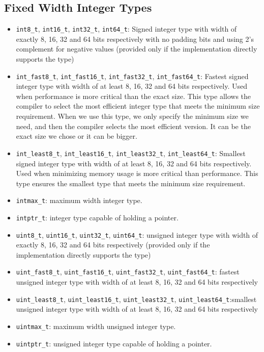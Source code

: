 \documentclass[12pt]{article}
\begin{document}
\subsection{Fixed Width Integer Types}
\begin{itemize}
    \item\texttt{int8\_t}, \texttt{int16\_t}, \texttt{int32\_t}, \texttt{int64\_t}: Signed integer type with width of
exactly 8, 16, 32 and 64 bits respectively
with no padding bits and using 2's complement for negative values
(provided only if the implementation directly supports the type)
    \item\texttt{int\_fast8\_t}, \texttt{int\_fast16\_t}, \texttt{int\_fast32\_t}, \texttt{int\_fast64\_t}: Fastest signed integer type with width of at least 8, 16, 32 and 64 bits respectively. Used when performance is more critical than the exact size. This type allows the compiler to select the most efficient integer type that meets the minimum size requirement. When we use this type, we only specify the minimum size we need, and then the compiler selects the most efficient version. It can be the exact size we chose or it can be bigger.
    \item\texttt{int\_least8\_t}, \texttt{int\_least16\_t}, \texttt{int\_least32\_t}, \texttt{int\_least64\_t}: Smallest signed integer type with width of at least 8, 16, 32 and 64 bits respectively. Used when minimizing memory usage is more critical than performance. This type ensures the smallest type that meets the minimum size requirement.
    \item\texttt{intmax\_t}: maximum width integer type.
    \item\texttt{intptr\_t}: integer type capable of holding a pointer.
    \item\texttt{uint8\_t}, \texttt{uint16\_t}, \texttt{uint32\_t}, \texttt{uint64\_t}: unsigned integer type with width of
exactly 8, 16, 32 and 64 bits respectively
(provided only if the implementation directly supports the type)
    \item\texttt{uint\_fast8\_t}, \texttt{uint\_fast16\_t}, \texttt{uint\_fast32\_t}, \texttt{uint\_fast64\_t}: fastest unsigned integer type with width of
at least 8, 16, 32 and 64 bits respectively
    \item\texttt{uint\_least8\_t}, \texttt{uint\_least16\_t}, \texttt{uint\_least32\_t}, \texttt{uint\_least64\_t}:smallest unsigned integer type with width of
at least 8, 16, 32 and 64 bits respectively
    \item\texttt{uintmax\_t}: maximum width unsigned integer type.
    \item\texttt{uintptr\_t}: unsigned integer type capable of holding a pointer.
\end{itemize} 
\end{document}
